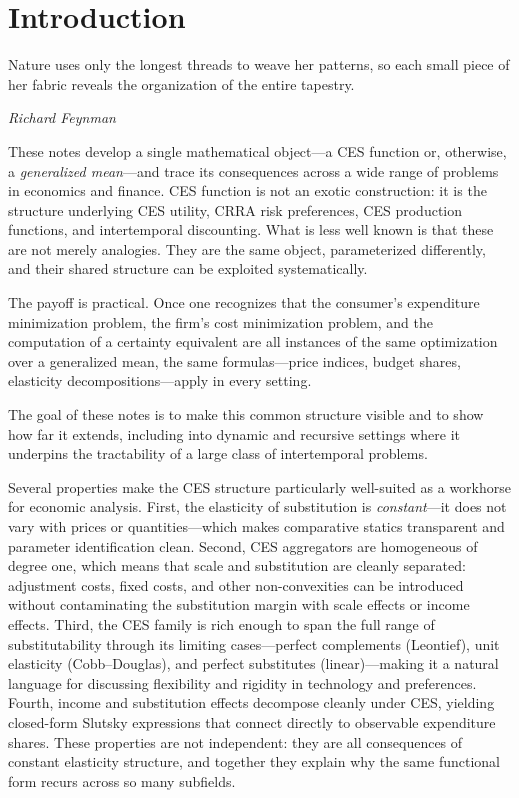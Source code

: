 
\chapter{Introduction}
\label{chap:introduction}
\epigraph{Nature uses only the longest threads to weave her patterns, so each small piece of her fabric reveals the organization of the entire tapestry.}{\textit{Richard Feynman}}

These notes develop a single mathematical object---a CES function or, otherwise, a \emph{generalized mean}---and trace its consequences across a wide range of problems in economics and finance.
CES function is not an exotic construction: it is the structure underlying CES utility, CRRA risk preferences, CES production functions, and intertemporal discounting.
What is less well known is that these are not merely analogies.
They are the same object, parameterized differently, and their shared structure can be exploited systematically.

The payoff is practical.
Once one recognizes that the consumer's expenditure minimization problem, the firm's cost minimization problem, and the computation of a certainty equivalent are all instances of the same optimization over a generalized mean, the same formulas---price indices, budget shares, elasticity decompositions---apply in every setting.

The goal of these notes is to make this common structure visible and to show how far it extends, including into dynamic and recursive settings where it underpins the tractability of a large class of intertemporal problems.

Several properties make the CES structure particularly well-suited as a workhorse for economic analysis.
First, the elasticity of substitution is \emph{constant}---it does not vary with prices or quantities---which makes comparative statics transparent and parameter identification clean.
Second, CES aggregators are homogeneous of degree one, which means that scale and substitution are cleanly separated: adjustment costs, fixed costs, and other non-convexities can be introduced without contaminating the substitution margin with scale effects or income effects.
Third, the CES family is rich enough to span the full range of substitutability through its limiting cases---perfect complements (Leontief), unit elasticity (Cobb--Douglas), and perfect substitutes (linear)---making it a natural language for discussing flexibility and rigidity in technology and preferences.
Fourth, income and substitution effects decompose cleanly under CES, yielding closed-form Slutsky expressions that connect directly to observable expenditure shares.
These properties are not independent: they are all consequences of constant elasticity structure, and together they explain why the same functional form recurs across so many subfields.

